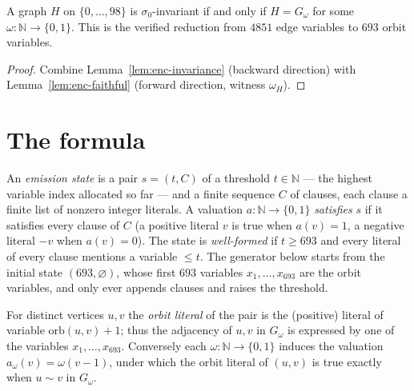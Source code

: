 \begin{proposition}\label{prop:orbitfun}
A graph $H$ on $\{0,\dots,98\}$ is $\sigma_0$-invariant if and only if
$H = G_\omega$ for some $\omega \colon \mathbb{N} \to \{0,1\}$.  This is the
verified reduction from $4851$ edge variables to $693$ orbit variables.
\leanok
{}
\end{proposition}

\begin{proof}\leanok
Combine Lemma~\ref{lem:enc-invariance} (backward direction) with
Lemma~\ref{lem:enc-faithful} (forward direction, witness $\omega_H$).
\end{proof}

\section{The formula}\label{ssec:enc-formula}

\begin{definition}\label{def:enc-state}
An \emph{emission state} is a pair $s = (t, C)$ of a threshold $t \in \mathbb{N}$
--- the highest variable index allocated so far --- and a finite sequence $C$
of clauses, each clause a finite list of nonzero integer literals.  A
valuation $a \colon \mathbb{N} \to \{0,1\}$ \emph{satisfies} $s$ if it satisfies
every clause of $C$ (a positive literal $v$ is true when $a(v) = 1$, a
negative literal $-v$ when $a(v) = 0$).  The state is \emph{well-formed} if
$t \geq 693$ and every literal of every clause mentions a variable $\leq t$.
The generator below starts from the initial state $(693, \varnothing)$, whose
first $693$ variables $x_1,\dots,x_{693}$ are the orbit variables, and only
ever appends clauses and raises the threshold.
\leanok
\end{definition}

\begin{definition}\label{def:enc-evar}
For distinct vertices $u,v$ the \emph{orbit literal} of the pair is the
(positive) literal of variable $\mathrm{orb}(u,v) + 1$; thus the adjacency of
$u,v$ in $G_\omega$ is expressed by one of the variables
$x_1,\dots,x_{693}$.  Conversely each $\omega \colon \mathbb{N} \to \{0,1\}$ induces
the valuation $a_\omega(v) = \omega(v-1)$, under which the orbit literal of
$(u,v)$ is true exactly when $u \sim v$ in $G_\omega$.
\leanok
{}
\end{definition}

